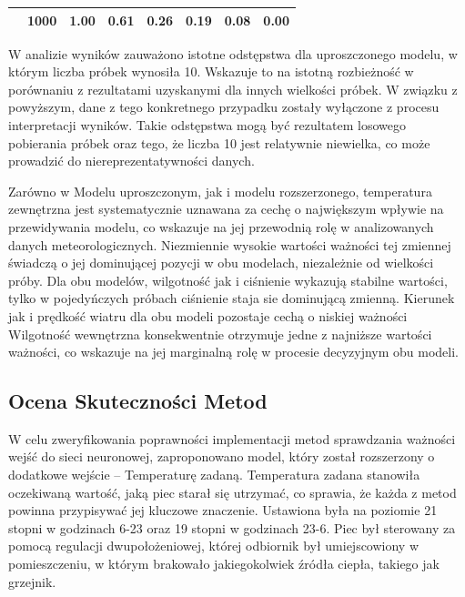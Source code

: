 \documentclass[a4paper,twoside,12pt]{book}
\begin{document}
\begin{table}[!h]
{\begin{tabular}{|c|c|c|c|c|c|c|c|}
                                                                                   & 1000                                                   & 1.00                                                              & 0.61                                                             & 0.26                                                              & 0.19                                                      & 0.08                                                      & 0.00                                                            \\ \hline
    \end{tabular}
  }
\end{table}

W analizie wyników zauważono istotne odstępstwa dla uproszczonego modelu, w którym liczba próbek wynosiła 10. Wskazuje to na istotną rozbieżność w porównaniu z rezultatami uzyskanymi dla innych wielkości próbek. W związku z powyższym, dane z tego konkretnego przypadku zostały wyłączone z procesu interpretacji wyników. Takie odstępstwa mogą być rezultatem losowego pobierania próbek oraz tego, że liczba 10 jest relatywnie niewielka, co może prowadzić do niereprezentatywności danych.

Zarówno w Modelu uproszczonym, jak i modelu rozszerzonego, temperatura zewnętrzna jest systematycznie uznawana za cechę o największym wpływie na przewidywania modelu, co wskazuje na jej przewodnią rolę w analizowanych danych meteorologicznych. Niezmiennie wysokie wartości ważności tej zmiennej świadczą o jej dominującej pozycji w obu modelach, niezależnie od wielkości próby. Dla obu modelów, wilgotność jak i ciśnienie wykazują stabilne wartości, tylko w pojedyńczych próbach ciśnienie staja sie dominującą zmienną. Kierunek jak i prędkość wiatru dla obu modeli pozostaje cechą o niskiej ważności Wilgotność wewnętrzna konsekwentnie otrzymuje jedne z najniższe wartości ważności, co wskazuje na jej marginalną rolę w procesie decyzyjnym obu modeli.

\subsection{Ocena Skuteczności Metod}
W celu zweryfikowania poprawności implementacji metod sprawdzania ważności wejść do sieci neuronowej, zaproponowano model, który został rozszerzony o dodatkowe wejście – Temperaturę zadaną. Temperatura zadana stanowiła oczekiwaną wartość, jaką piec starał się utrzymać, co sprawia, że każda z metod powinna przypisywać jej kluczowe znaczenie. Ustawiona była na poziomie 21 stopni w godzinach 6-23 oraz 19 stopni w godzinach 23-6. Piec był sterowany za pomocą regulacji dwupołożeniowej, której odbiornik był umiejscowiony w pomieszczeniu, w którym brakowało jakiegokolwiek źródła ciepła, takiego jak grzejnik.
\end{document}
